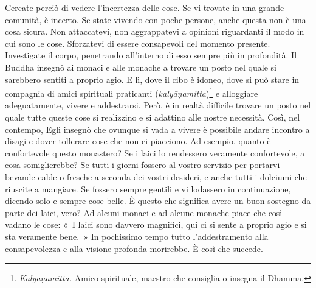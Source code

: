 Cercate perciò di vedere l'incertezza delle cose. Se vi trovate in una
grande comunità, è incerto. Se state vivendo con poche persone, anche
questa non è una cosa sicura. Non attaccatevi, non aggrappatevi a
opinioni riguardanti il modo in cui sono le cose. Sforzatevi di essere
consapevoli del momento presente. Investigate il corpo, penetrando
all'interno di esso sempre più in profondità. Il Buddha insegnò ai
monaci e alle monache a trovare un posto nel quale si sarebbero sentiti
a proprio agio. E lì, dove il cibo è idoneo, dove si può stare in
compagnia di amici spirituali praticanti
(\emph{kalyāṇamitta})\footnote{%
  \emph{Kalyāṇamitta.} Amico spirituale, maestro che consiglia o insegna il
  Dhamma.}
e alloggiare adeguatamente, vivere e addestrarsi. Però, è in realtà
difficile trovare un posto nel quale tutte queste cose si realizzino e
si adattino alle nostre necessità. Così, nel contempo, Egli insegnò che
ovunque si vada a vivere è possibile andare incontro a disagi e dover
tollerare cose che non ci piacciono. Ad esempio, quanto è confortevole
questo monastero? Se i laici lo rendessero veramente confortevole, a
cosa somiglierebbe? Se tutti i giorni fossero al vostro servizio per
portarvi bevande calde o fresche a seconda dei vostri desideri, e anche
tutti i dolciumi che riuscite a mangiare. Se fossero sempre gentili e vi
lodassero in continuazione, dicendo solo e sempre cose belle. È questo
che significa avere un buon sostegno da parte dei laici, vero? Ad alcuni
monaci e ad alcune monache piace che così vadano le cose: «~I laici sono
davvero magnifici, qui ci si sente a proprio agio e si sta veramente
bene.~» In pochissimo tempo tutto l'addestramento alla consapevolezza e
alla visione profonda morirebbe. È così che succede.

